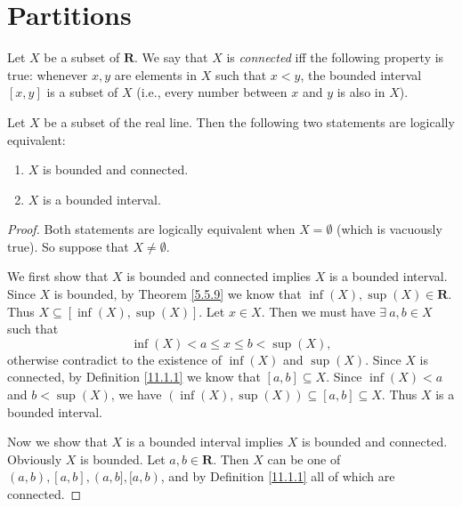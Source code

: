 \section{Partitions}\label{sec 11.1}

\begin{definition}\label{11.1.1}
    Let \(X\) be a subset of \(\mathbf{R}\).
    We say that \(X\) is \emph{connected} iff the following property is true:
    whenever \(x, y\) are elements in \(X\) such that \(x < y\), the bounded interval \([x, y]\) is a subset of \(X\)
    (i.e., every number between \(x\) and \(y\) is also in \(X\)).
\end{definition}

\setcounter{theorem}{3}
\begin{lemma}\label{11.1.4}
    Let \(X\) be a subset of the real line.
    Then the following two statements are logically equivalent:
    \begin{enumerate}
        \item \(X\) is bounded and connected.
        \item \(X\) is a bounded interval.
    \end{enumerate}
\end{lemma}

\begin{proof}
    Both statements are logically equivalent when \(X = \emptyset\) (which is vacuously true).
    So suppose that \(X \neq \emptyset\).

    We first show that \(X\) is bounded and connected implies \(X\) is a bounded interval.
    Since \(X\) is bounded, by Theorem \ref{5.5.9} we know that \(\inf(X), \sup(X) \in \mathbf{R}\).
    Thus \(X \subseteq [\inf(X), \sup(X)]\).
    Let \(x \in X\).
    Then we must have \(\exists\ a, b \in X\) such that
    \[
        \inf(X) < a \leq x \leq b < \sup(X),
    \]
    otherwise contradict to the existence of \(\inf(X)\) and \(\sup(X)\).
    Since \(X\) is connected, by Definition \ref{11.1.1} we know that \([a, b] \subseteq X\).
    Since \(\inf(X) < a\) and \(b < \sup(X)\), we have \((\inf(X), \sup(X)) \subseteq [a, b] \subseteq X\).
    Thus \(X\) is a bounded interval.

    Now we show that \(X\) is a bounded interval implies \(X\) is bounded and connected.
    Obviously \(X\) is bounded.
    Let \(a, b \in \mathbf{R}\).
    Then \(X\) can be one of \((a, b), [a, b], (a, b], [a, b)\), and by Definition \ref{11.1.1} all of which are connected.
\end{proof}

